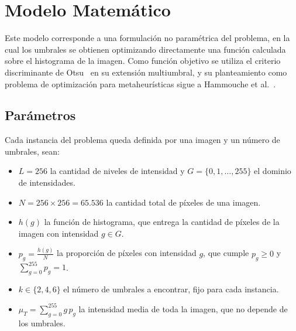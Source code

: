 \documentclass[letter, 10pt]{article}
\begin{document}
\section{Modelo Matem\'atico}
\label{sec:modelo}
Este modelo corresponde a una formulaci\'on no param\'etrica del problema, en la cual los umbrales se obtienen optimizando directamente una funci\'on calculada sobre el histograma de la imagen.
Como funci\'on objetivo se utiliza el criterio discriminante de Otsu~\cite{Otsu1979} en su extensi\'on multiumbral,
y su planteamiento como problema de optimizaci\'on para metaheur\'isticas sigue a Hammouche et al.~\cite{Hammouche2010Comparative}.

\subsection{Par\'ametros}
Cada instancia del problema queda definida por una imagen y un n\'umero de umbrales, sean:
\begin{itemize}
    \item $L = 256$ la cantidad de niveles de intensidad y $G = \{0, 1, \dots, 255\}$ el dominio de intensidades.
    \item $N = 256 \times 256 = 65.536$ la cantidad total de p\'ixeles de una imagen.
    \item $h(g)$ la funci\'on de histograma, que entrega la cantidad de p\'ixeles de la imagen con intensidad $g \in G$.
    \item $p_g = \frac{h(g)}{N}$ la proporci\'on de p\'ixeles con intensidad $g$, que cumple $p_g \geq 0$ y $\sum\limits_{g=0}^{255} p_g = 1$.
    \item $k \in \{2, 4, 6\}$ el n\'umero de umbrales a encontrar, fijo para cada instancia.
    \item $\mu_T = \sum\limits_{g=0}^{255} g\, p_g$ la intensidad media de toda la imagen, que no depende de los umbrales.
\end{itemize}
\end{document}
